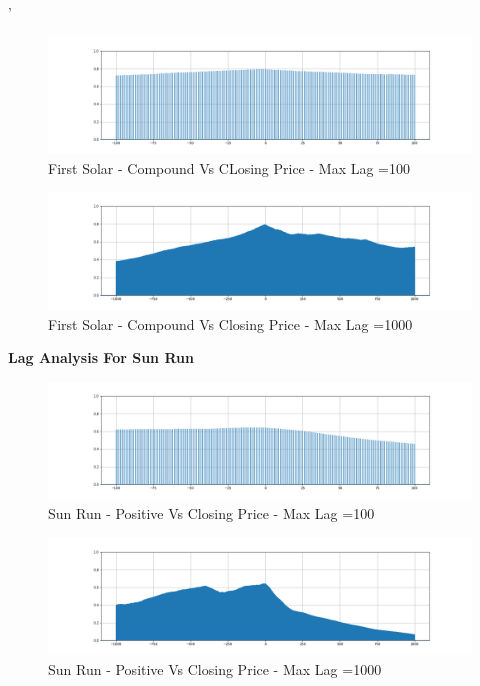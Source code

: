 \documentclass[sigconf, nonacm]{acmart}
\begin{document}
'%
\begin{figure}[H]
  \centering
  \includegraphics[width=\linewidth]{images/fslr_100_comp.png}
  \caption{First Solar - Compound Vs CLosing Price - Max Lag =100}
\end{figure}

\begin{figure}[H]
  \centering
  \includegraphics[width=\linewidth]{images/fslr_1000_comp.png}
  \caption{First Solar - Compound Vs Closing Price - Max Lag =1000}
\end{figure}





\textbf{Lag Analysis For Sun Run}
\newline
\begin{figure}[H]
  \centering
  \includegraphics[width=\linewidth]{images/srun_100_pos.png}
  \caption{Sun Run - Positive Vs Closing Price - Max Lag =100}
\end{figure}

\begin{figure}[H]
  \centering
  \includegraphics[width=\linewidth]{images/srun_1000_pos.png}
  \caption{Sun Run - Positive Vs Closing Price - Max Lag =1000}
\end{figure}
\end{document}
